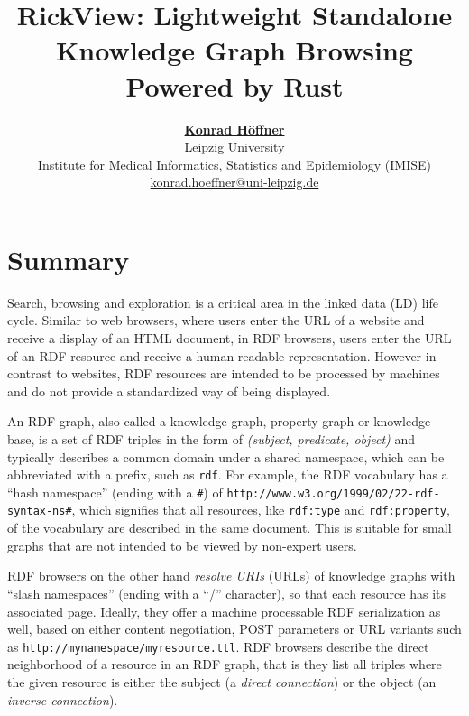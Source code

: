 \documentclass[a4paper,10pt]{article}
\begin{document}
\author{\href{https://orcid.org/0000-0001-7358-3217}{\textbf{Konrad Höffner}} \\ Leipzig University \\ 
Institute for Medical Informatics, Statistics and Epidemiology (IMISE)\\
\href{mailto:konrad.hoeffner@uni-leipzig.de}{konrad.hoeffner@uni-leipzig.de}}
\title{\textbf{RickView: Lightweight Standalone Knowledge Graph Browsing Powered by Rust}}
\date{}

\maketitle

\section{Summary}\label{summary}

Search, browsing and exploration is a critical area in the linked data (LD) life cycle.
Similar to web browsers, where users enter the URL of a website and receive a display of an HTML document, in RDF browsers,
users enter the URL of an RDF resource and receive a human readable representation.
However in contrast to websites, RDF resources are intended to be processed by machines and do not provide a standardized way of being displayed.

An RDF graph, also called a knowledge graph, property graph or knowledge base, is a set of RDF triples in the form of \emph{(subject, predicate, object)} and typically describes a common domain under a shared namespace, which can be abbreviated with a prefix, such as \texttt{rdf}.
For example, the RDF vocabulary has a \enquote{hash namespace} (ending with a \texttt{\#}) of \texttt{http://www.w3.org/1999/02/22-rdf-syntax-ns\#},
which signifies that all resources, like \texttt{rdf:type} and \texttt{rdf:property}, of the vocabulary are described in the same document.
This is suitable for small graphs that are not intended to be viewed by non-expert users.

RDF browsers on the other hand \emph{resolve URIs} (URLs) of knowledge graphs with \enquote{slash namespaces} (ending with a \enquote{/} character), so that each resource has its associated page.
Ideally, they offer a machine processable RDF serialization as well, based on either content negotiation, POST parameters or URL variants such as \texttt{http://mynamespace/myresource.ttl}.
RDF browsers describe the direct neighborhood of a resource in an RDF graph, that is they list all triples where the given resource is either the subject (a \emph{direct connection}) or the object (an \emph{inverse connection}).
\end{document}

